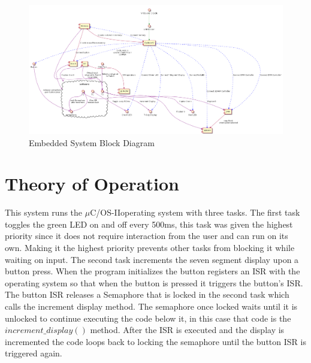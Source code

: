 \documentclass[10pt,a4paper]{article}
\begin{document}
		\begin{figure}[H]
			\centering\includegraphics[width=15cm]{Final_Block_Diagram.png}
			\caption{Embedded System Block Diagram}
			\label{block}
		\end{figure}
	
	\section{Theory of Operation}
	This system runs the $\mu$C/OS-II\texttrademark operating system with three tasks. The first task toggles the green LED on and off every 500ms, this task was given the highest priority since it does not require interaction from the user and can run on its own. Making it the highest priority prevents other tasks from blocking it while waiting on input. The second task increments the seven segment display upon a button press. When the program initializes the button registers an ISR with the operating system so that when the button is pressed it triggers the button's ISR. The button ISR releases a Semaphore that is locked in the second task which calls the increment display method. The semaphore once locked waits until it is unlocked to continue executing the code below it, in this case that code is the $increment\_display()$ method. After the ISR is executed and the display is incremented the code loops back to locking the semaphore until the button ISR is triggered again.
	
\end{document}
